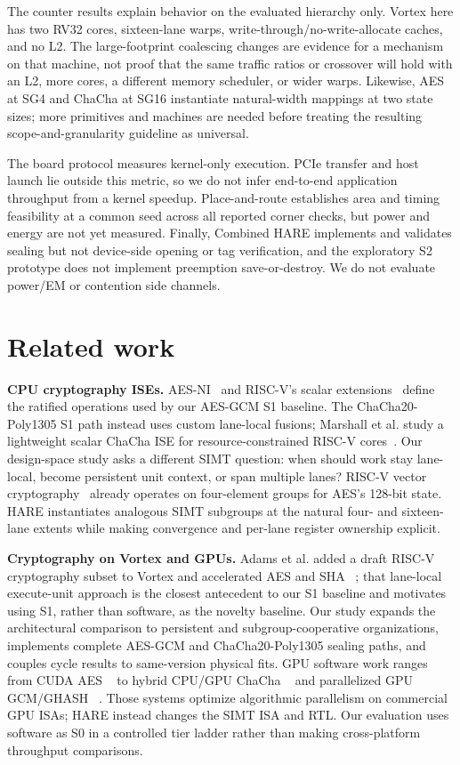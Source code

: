 \documentclass[conference]{IEEEtran}
\begin{document}
The counter results explain behavior on the evaluated hierarchy only. Vortex
here has two RV32 cores, sixteen-lane warps, write-through/no-write-allocate
caches, and no L2. The large-footprint coalescing changes are evidence for a
mechanism on that machine, not proof that the same traffic ratios or crossover
will hold with an L2, more cores, a different memory scheduler, or wider warps.
Likewise, AES at SG4 and ChaCha at SG16 instantiate natural-width mappings at
two state sizes; more primitives and machines are needed before treating the
resulting scope-and-granularity guideline as universal.

The board protocol measures kernel-only execution. PCIe transfer and host
launch lie outside this metric, so we do not infer end-to-end application
throughput from a kernel speedup. Place-and-route establishes area and timing
feasibility at a common seed across all reported corner checks, but power and
energy are not yet measured. Finally, Combined HARE implements and validates
sealing but not device-side opening or tag verification, and the exploratory
S2 prototype does not implement preemption save-or-destroy. We do not evaluate
power/EM or contention side channels.

\section{Related work}\label{sec:related}
\textbf{CPU cryptography ISEs.} AES-NI~\cite{gueron2010aesni} and RISC-V's
scalar extensions~\cite{riscv-scalar-crypto,marshall2021aesise} define the
ratified operations used by our AES-GCM S1 baseline. The
ChaCha20-Poly1305 S1 path instead uses custom
lane-local fusions; Marshall et al. study a lightweight scalar ChaCha ISE for
resource-constrained RISC-V cores~\cite{marshall2021chacha}. Our design-space
study asks a different SIMT question: when should work stay lane-local, become
persistent unit context, or span multiple lanes? RISC-V vector
cryptography~\cite{riscv-vector-crypto} already operates on four-element
groups for AES's 128-bit state. HARE instantiates analogous SIMT subgroups at
the natural four- and sixteen-lane extents while making convergence and
per-lane register ownership explicit.

\textbf{Cryptography on Vortex and GPUs.} Adams et al. added a draft RISC-V
cryptography subset to Vortex and accelerated AES and SHA
~\cite{adams2021crypto}; that lane-local execute-unit approach is the closest
antecedent to our S1 baseline and motivates using S1, rather than software, as
the novelty baseline. Our study expands the architectural comparison to persistent and
subgroup-cooperative organizations, implements complete AES-GCM and
ChaCha20-Poly1305 sealing paths, and couples cycle results to same-version
physical fits. GPU software work ranges from CUDA AES
~\cite{manavski2007cuda} to hybrid CPU/GPU ChaCha
~\cite{wang2021gpuchacha} and parallelized GPU GCM/GHASH
~\cite{lee2025gpugcm}. Those systems optimize algorithmic parallelism on
commercial GPU ISAs; HARE instead changes the SIMT ISA and RTL. Our evaluation
uses software as S0 in a controlled tier ladder rather than making
cross-platform throughput comparisons.
\end{document}
